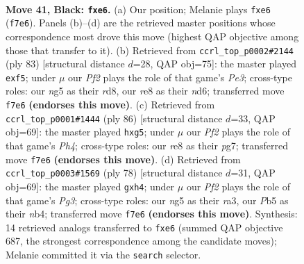 \documentclass[11pt]{article}
\begin{document}
\clearpage

\begin{figure}[p]\centering
\begin{subfigure}{0.46\textwidth}\centering
\resizebox{\linewidth}{!}{%
\newchessgame
\chessboard[
  setfen={4R3/5pk1/2p1P3/bp3bN1/8/8/8/5K2 b - - 0 41},
  showmover=false,
  pgfstyle=straightmove, color=movearrow, markmove={f7-e6}
]}
\caption{}
\end{subfigure}\hfill
\begin{subfigure}{0.46\textwidth}\centering
\resizebox{\linewidth}{!}{%
\newchessgame
\chessboard[
  setfen={3R4/7k/3Np1pp/5P2/1r6/6K1/7P/8 b - - 0 42},
  showmover=false,
  pgfstyle=straightmove, color=movearrow, markmove={e6-f5}
]}
\caption{}
\end{subfigure}
\\[4pt]
\begin{subfigure}{0.46\textwidth}\centering
\resizebox{\linewidth}{!}{%
\newchessgame
\chessboard[
  setfen={8/4kpp1/1n6/6p1/3KBP1P/8/8/8 w - - 0 44},
  showmover=false,
  pgfstyle=straightmove, color=movearrow, markmove={h4-g5}
]}
\caption{}
\end{subfigure}\hfill
\begin{subfigure}{0.46\textwidth}\centering
\resizebox{\linewidth}{!}{%
\newchessgame
\chessboard[
  setfen={8/8/5k2/p6R/1n2B2p/r5P1/5K2/8 w - - 0 40},
  showmover=false,
  pgfstyle=straightmove, color=movearrow, markmove={g3-h4}
]}
\caption{}
\end{subfigure}
\caption{\textbf{Move 41, Black: \texttt{fxe6}.} (a) Our position; Melanie plays \texttt{fxe6} (\texttt{f7e6}). Panels (b)--(d) are the retrieved master positions whose correspondence most drove this move (highest QAP objective among those that transfer to it). (b) Retrieved from \texttt{ccrl\_top\_p0002\#2144} (ply 83) [structural distance $d$=28, QAP obj=75]: the master played \texttt{exf5}; under $\mu$ our \emph{Pf2} plays the role of that game's \emph{Pe3}; cross-type roles: our \emph{n}g5 as their \emph{r}d8, our \emph{r}e8 as their \emph{n}d6; transferred move \texttt{f7e6} \textbf{(endorses this move)}. (c) Retrieved from \texttt{ccrl\_top\_p0001\#1444} (ply 86) [structural distance $d$=33, QAP obj=69]: the master played \texttt{hxg5}; under $\mu$ our \emph{Pf2} plays the role of that game's \emph{Ph4}; cross-type roles: our \emph{r}e8 as their \emph{p}g7; transferred move \texttt{f7e6} \textbf{(endorses this move)}. (d) Retrieved from \texttt{ccrl\_top\_p0003\#1569} (ply 78) [structural distance $d$=31, QAP obj=69]: the master played \texttt{gxh4}; under $\mu$ our \emph{Pf2} plays the role of that game's \emph{Pg3}; cross-type roles: our \emph{n}g5 as their \emph{r}a3, our \emph{P}b5 as their \emph{n}b4; transferred move \texttt{f7e6} \textbf{(endorses this move)}. Synthesis: 14 retrieved analogs transferred to \texttt{fxe6} (summed QAP objective 687, the strongest correspondence among the candidate moves); Melanie committed it via the \texttt{search} selector.}
\label{fig:thought-m81}
\end{figure}
\end{document}
